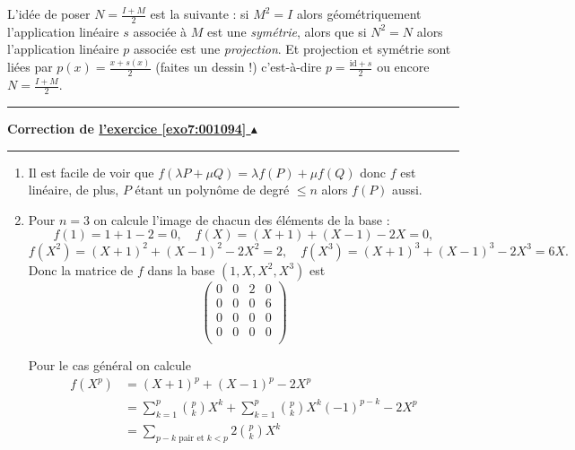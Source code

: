 \documentclass[11pt,a4paper]{article}
\renewcommand{\le}{\leqslant} \renewcommand{\leq}{\leqslant}
\newcounter{exo}
\newcommand{\correction}[1]{\hypertarget{cor7:#1}{}\label{cor7:#1}{\bf Correction de \hyperlink{exo7:#1}{l'exercice \ref{exo7:#1} $\blacktriangle$}}\vspace{1mm}\hrule\vspace{1mm}}
\newcommand{\fincorrection}{\vspace{1mm}\hrule\vspace*{7mm}}
\begin{document}
\begin{enumerate}
L'idée de poser $N= \frac{I+M}{2}$ est la suivante : si $M^2=I$ alors géométriquement l'application
linéaire $s$ associée à $M$ est une \emph{symétrie}, alors que si $N^2=N$ alors l'application
linéaire $p$ associée est une \emph{projection}. Et projection et symétrie sont liées par $p(x) =\frac{x+s(x)}{2}$ 
(faites un dessin !) c'est-à-dire $p =\frac{\text{id}+s}{2}$ ou encore $N= \frac{I+M}{2}$.


\end{enumerate}

\fincorrection
\correction{001094}
\begin{enumerate}
  \item Il est facile de voir que $f(\lambda P + \mu Q) = \lambda f(P)+\mu f(Q)$ donc $f$ est linéaire,
de plus, $P$ étant un polynôme de degré $\le n$ alors $f(P)$ aussi.

  \item Pour $n=3$ on calcule l'image de chacun des éléments de la base :
$$f(1)=1+1-2=0,\quad f(X)=(X+1)+(X-1)-2X=0,$$
$$f(X^2)=(X+1)^2+(X-1)^2-2X^2=2,
\quad f(X^3)=(X+1)^3+(X-1)^3-2X^3=6X.$$
Donc la matrice de $f$ dans la base $(1, X, X^2, X^3)$ est
$$\begin{pmatrix}
0 & 0 & 2 & 0 \\
0 & 0 & 0 & 6 \\
0 & 0 & 0 & 0 \\
0 & 0 & 0 & 0 \\     
  \end{pmatrix}$$

Pour le cas général on calcule 
\begin{align*}
f(X^p)
 &=(X+1)^p+(X-1)^p-2X^p \\
 &= \sum_{k=1}^p \binom{p}{k}X^k + \sum_{k=1}^p \binom{p}{k}X^k(-1)^{p-k} -2X^p\\
 &= \sum_{p-k \text{ pair et } k<p} 2\binom{p}{k}X^k  
\end{align*}


\end{enumerate}
\end{document}
